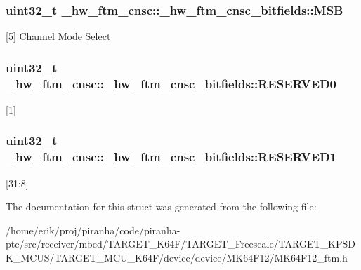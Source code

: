 \subsubsection[{\texorpdfstring{M\+SB}{MSB}}]{\setlength{\rightskip}{0pt plus 5cm}uint32\+\_\+t \+\_\+hw\+\_\+ftm\+\_\+cnsc\+::\+\_\+hw\+\_\+ftm\+\_\+cnsc\+\_\+bitfields\+::\+M\+SB}\hypertarget{struct__hw__ftm__cnsc_1_1__hw__ftm__cnsc__bitfields_a787ffcbb353a2d014e34ecfe05c76b4e}{}\label{struct__hw__ftm__cnsc_1_1__hw__ftm__cnsc__bitfields_a787ffcbb353a2d014e34ecfe05c76b4e}
\mbox{[}5\mbox{]} Channel Mode Select 
\subsubsection[{\texorpdfstring{R\+E\+S\+E\+R\+V\+E\+D0}{RESERVED0}}]{\setlength{\rightskip}{0pt plus 5cm}uint32\+\_\+t \+\_\+hw\+\_\+ftm\+\_\+cnsc\+::\+\_\+hw\+\_\+ftm\+\_\+cnsc\+\_\+bitfields\+::\+R\+E\+S\+E\+R\+V\+E\+D0}\hypertarget{struct__hw__ftm__cnsc_1_1__hw__ftm__cnsc__bitfields_aeec65bf514f181321b25a3d10ca87e49}{}\label{struct__hw__ftm__cnsc_1_1__hw__ftm__cnsc__bitfields_aeec65bf514f181321b25a3d10ca87e49}
\mbox{[}1\mbox{]} 
\subsubsection[{\texorpdfstring{R\+E\+S\+E\+R\+V\+E\+D1}{RESERVED1}}]{\setlength{\rightskip}{0pt plus 5cm}uint32\+\_\+t \+\_\+hw\+\_\+ftm\+\_\+cnsc\+::\+\_\+hw\+\_\+ftm\+\_\+cnsc\+\_\+bitfields\+::\+R\+E\+S\+E\+R\+V\+E\+D1}\hypertarget{struct__hw__ftm__cnsc_1_1__hw__ftm__cnsc__bitfields_aad00d6f175fc0b2e6bb8fc7e078af120}{}\label{struct__hw__ftm__cnsc_1_1__hw__ftm__cnsc__bitfields_aad00d6f175fc0b2e6bb8fc7e078af120}
\mbox{[}31\+:8\mbox{]} 

The documentation for this struct was generated from the following file\+:\begin{DoxyCompactItemize}
\item 
/home/erik/proj/piranha/code/piranha-\/ptc/src/receiver/mbed/\+T\+A\+R\+G\+E\+T\+\_\+\+K64\+F/\+T\+A\+R\+G\+E\+T\+\_\+\+Freescale/\+T\+A\+R\+G\+E\+T\+\_\+\+K\+P\+S\+D\+K\+\_\+\+M\+C\+U\+S/\+T\+A\+R\+G\+E\+T\+\_\+\+M\+C\+U\+\_\+\+K64\+F/device/device/\+M\+K64\+F12/M\+K64\+F12\+\_\+ftm.\+h\end{DoxyCompactItemize}
